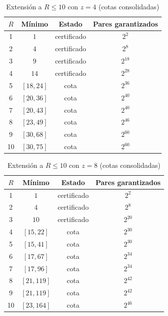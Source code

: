 \documentclass[conference]{IEEEtran}
\begin{document}
\begin{table}[t]
\caption{Extensión a $R\le10$ con $z=4$ (cotas consolidadas)}
\label{tab:ext}
\centering
\begin{tabular}{@{}cccc@{}}
\toprule
$R$ & Mínimo & Estado & Pares garantizados \\
\midrule
1  & $1$         & certificado & $2^{2}$ \\
2  & $4$         & certificado & $2^{8}$ \\
3  & $9$         & certificado & $2^{18}$ \\
4  & $14$        & certificado & $2^{28}$ \\
5  & $[18,24]$   & cota        & $2^{36}$ \\
6  & $[20,36]$   & cota        & $2^{40}$ \\
7  & $[20,43]$   & cota        & $2^{40}$ \\
8  & $[23,49]$   & cota        & $2^{46}$ \\
9  & $[30,68]$   & cota        & $2^{60}$ \\
10 & $[30,75]$   & cota        & $2^{60}$ \\
\bottomrule
\end{tabular}
\end{table}

\begin{table}[t]
\caption{Extensión a $R\le10$ con $z=8$ (cotas consolidadas)}
\label{tab:ext8}
\centering
\begin{tabular}{@{}cccc@{}}
\toprule
$R$ & Mínimo & Estado & Pares garantizados \\
\midrule
1  & $1$         & certificado & $2^{2}$ \\
2  & $4$         & certificado & $2^{8}$ \\
3  & $10$        & certificado & $2^{20}$ \\
4  & $[15,22]$   & cota        & $2^{30}$ \\
5  & $[15,41]$   & cota        & $2^{30}$ \\
6  & $[17,67]$   & cota        & $2^{34}$ \\
7  & $[17,96]$   & cota        & $2^{34}$ \\
8  & $[21,119]$  & cota        & $2^{42}$ \\
9  & $[21,119]$  & cota        & $2^{42}$ \\
10 & $[23,164]$  & cota        & $2^{46}$ \\
\bottomrule
\end{tabular}
\end{table}
\end{document}
